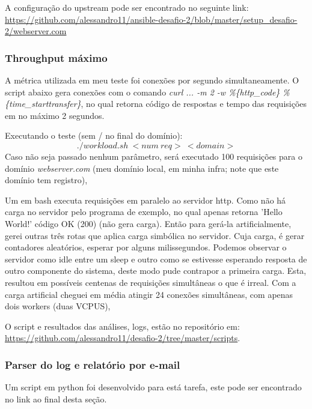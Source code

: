A configuração do upstream pode ser encontrado no seguinte link:\\
\href{https://github.com/alessandro11/ansible-desafio-2/blob/master/setup\_desafio-2/webserver.com}{https://github.com/alessandro11/ansible-desafio-2/blob/master/setup\_desafio-2/webserver.com}


\subsubsection{Throughput máximo}
A métrica utilizada em meu teste foi conexões por segundo
simultaneamente. O script abaixo gera conexões com o comando
\emph{curl ... -m 2 -w \%\{http\_code\} \%\{time\_starttransfer\}}, no
qual retorna código de respostas e tempo das requisições em no máximo
2 segundos.

Executando o teste (sem / no final do domínio):
$$./workload.sh\ <num\ req>\ <domain>$$
Caso não seja passado nenhum parâmetro, será executado 100 requisições
para o domínio \emph{webserver.com} (meu domínio local, em minha infra; note
que este domínio tem registro),

Um
\label{script:carga}
em bash executa requisições em paralelo ao servidor http. Como não há
carga no servidor pelo programa de exemplo, no qual apenas retorna
'Hello World!' código OK (200) (não gera carga). Então para gerá-la
artificialmente, gerei outras três rotas que aplica carga simbólica
no servidor. Cuja carga, é gerar contadores aleatórios, esperar por
alguns milissegundos. Podemos observar o servidor como idle entre um
sleep e outro como se estivesse esperando resposta de outro componente
do sistema, deste modo pude contrapor a primeira carga. Esta, resultou
em possíveis centenas de requisições simultâneas o que é irreal. Com a
carga artificial cheguei em média atingir 24 conexões simultâneas, com
apenas dois workers (duas VCPUS),

O script e resultados das análises, logs, estão no repositório em:\\
\href{https://github.com/alessandro11/desafio-2/tree/master/scripts}{https://github.com/alessandro11/desafio-2/tree/master/scripts}.


\subsubsection{Parser do log e relatório por e-mail}
Um script em python foi desenvolvido para está tarefa, este pode ser
encontrado no link ao final desta seção.

